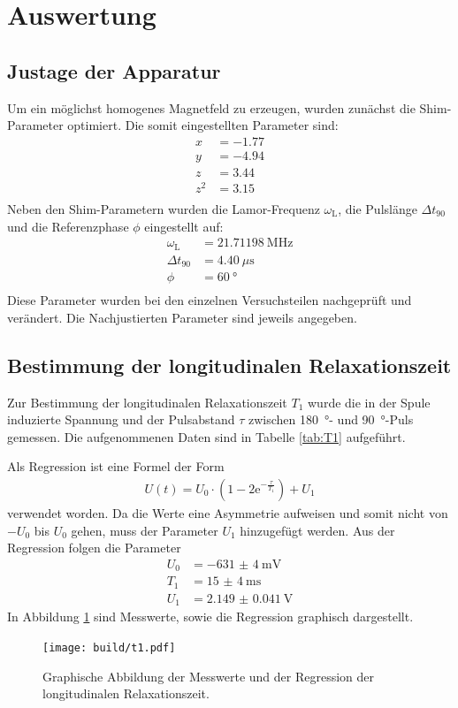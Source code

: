 \newpage
\section{Auswertung}
\label{sec:Auswertung}

\subsection{Justage der Apparatur}
Um ein möglichst homogenes Magnetfeld zu erzeugen, wurden zunächst die
Shim-Parameter optimiert. Die somit eingestellten Parameter sind:
\begin{align*}
  x &= \num{-1.77}  \\
  y &= \num{-4.94}  \\
  z &= \num{+3.44}  \\
  z^2 &= \num{+3.15} \\
\end{align*}
Neben den Shim-Parametern wurden die Lamor-Frequenz $\omega_\text{L}$, die
Pulslänge $\Delta t_\text{90}$ und die Referenzphase $\phi$ eingestellt auf:
\begin{align*}
  \omega_\text{L} &= \SI{21.71198}{\mega\hertz} \\
  \Delta t_\text{90} &= \SI{4.40}{\mu\second} \\
  \phi &= \SI{60}{\degree} \\
\end{align*}
Diese Parameter wurden bei den einzelnen Versuchsteilen nachgeprüft und
verändert. Die Nachjustierten Parameter sind jeweils angegeben.

\subsection{Bestimmung der longitudinalen Relaxationszeit}
Zur Bestimmung der longitudinalen Relaxationszeit $T_1$ wurde die in der
Spule induzierte Spannung und der Pulsabstand $\tau$ zwischen \SI{180}{\degree}-
und \SI{90}{\degree}-Puls gemessen. Die aufgenommenen Daten sind in Tabelle
\ref{tab:T1} aufgeführt.

Als Regression ist eine Formel der Form
\begin{align*}
  U(t) = U_0 \cdot \left(1- 2\text{e}^{-\frac{\tau}{T_1}}\right) + U_1
\end{align*}
verwendet worden. Da die Werte eine Asymmetrie aufweisen und somit nicht von
$-U_0$ bis $U_0$ gehen, muss der Parameter $U_1$ hinzugefügt werden.
Aus der Regression folgen die Parameter
\begin{align*}
  U_0 &= -\SI{631(4)}{\milli\volt} \\
  T_1 &= \SI{15(4)}{\milli\second} \\
  U_1 &= \SI{2.149(41)}{\volt}
\end{align*}
In Abbildung \ref{plt:T1} sind Messwerte, sowie die Regression graphisch dargestellt.
\begin{figure}[htb]
  \centering
  \texttt{[image: build/t1.pdf]}
  \caption{Graphische Abbildung der Messwerte und der Regression der longitudinalen Relaxationszeit.}
  \label{plt:T1}
\end{figure}


